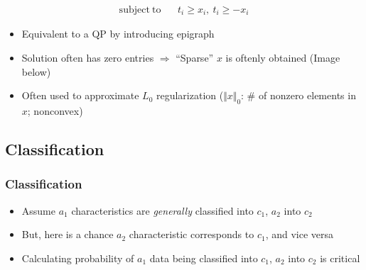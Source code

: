 \begin{itemize}
$$\begin{aligned}
            \mathrm{subject~to}~~&~~t_i\geq x_i,~t_i\geq -x_i
        \end{aligned} $$
    \begin{itemize}
        \item Equivalent to a QP by introducing epigraph
        \item Solution often has zero entries $\Rightarrow$ ``Sparse'' $x$ is oftenly obtained (Image below)
        \item Often used to approximate $L_0$ regularization ($\Vert x\Vert_0$: \# of nonzero elements in $x$; nonconvex)
    \end{itemize}
    \begin{figures}
    \end{figures}
\end{itemize}

\subsection{Classification}

\subsubsection*{Classification}
\begin{itemize}
    \item Assume $a_1$ characteristics are \textit{generally} classified into $c_1$, $a_2$ into $c_2$
    \item But, here is a chance $a_2$ characteristic corresponds to $c_1$, and vice versa
    \item Calculating probability of $a_1$ data being classified into $c_1$, $a_2$ into $c_2$ is critical
\end{itemize}

